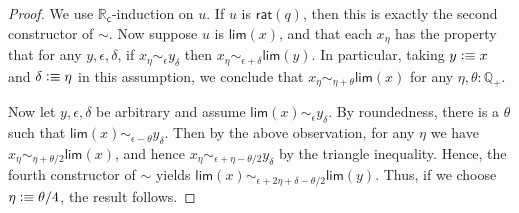 \documentclass[10pt,a4paper]{article}
\newcommand{\defeq}{\vcentcolon\equiv}  %
\newcommand{\Q}{\ensuremath{\mathbb{Q}}\xspace}
\newcommand{\RC}{\ensuremath{\mathbb{R}_\mathsf{c}}\xspace} %
\newcommand{\close}[1]{\sim_{#1}} %
\newcommand{\closesym}{\mathord\sim}
\newcommand{\rclim}{\mathsf{lim}} %
\newcommand{\rcrat}{\mathsf{rat}} %
\newcommand{\Qp}{\Q_{+}}
\theoremstyle{definition}
\theoremstyle{remark}
\numberwithin{equation}{section}
\begin{document}
\begin{proof}
  We use $\RC$-induction on $u$.
  If $u$ is $\rcrat(q)$, then this is exactly the second constructor of $\closesym$.
  Now suppose $u$ is $\rclim(x)$, and that each $x_\eta$ has the property that for any $y,\epsilon,\delta$, if $x_\eta\close\epsilon y_\delta$ then $x_\eta \close{\epsilon+\delta} \rclim(y)$.
  In particular, taking $y\defeq x$ and $\delta\defeq\eta$ in this assumption, we conclude that $x_\eta \close{\eta+\theta} \rclim(x)$ for any $\eta,\theta:\Qp$.

  Now let $y,\epsilon,\delta$ be arbitrary and assume $\rclim(x) \close\epsilon y_\delta$.
  By roundedness, there is a $\theta$ such that $\rclim(x) \close{\epsilon-\theta} y_\delta$.
  Then by the above observation, for any $\eta$ we have $x_\eta \close{\eta+\theta/2} \rclim(x)$, and hence $x_\eta \close{\epsilon+\eta-\theta/2} y_\delta$ by the triangle inequality.
  Hence, the fourth constructor of $\closesym$ yields $\rclim(x) \close{\epsilon+2\eta+\delta-\theta/2} \rclim(y)$.
  Thus, if we choose $\eta \defeq \theta/4$, the result follows.
\end{proof}
\end{document}
